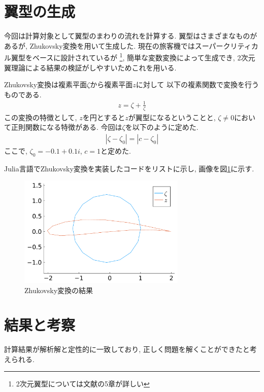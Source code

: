 \documentclass{ltjsarticle}
\begin{document}
\section{翼型の生成}
今回は計算対象として翼型のまわりの流れを計算する. 
翼型はさまざまなものがあるが, Zhukovsky変換を用いて生成した. 
現在の旅客機ではスーパークリティカル翼型をベースに設計されているが
\cite{Rinoie2011}\footnote{2次元翼型については文献\cite{Rinoie2011}の5章が詳しい},
簡単な変数変換によって生成でき, 
2次元翼理論による結果の検証がしやすいためこれを用いる.

Zhukovsky変換は複素平面$\zeta$から複素平面$z$に対して
以下の複素関数で変換を行うものである.
\begin{align}
    z = \zeta +\frac{1}{\zeta}
\end{align}
この変換の特徴として, $z$を円とすると$z$が翼型になるということと,
$\zeta\neq 0$において正則関数になる特徴がある.
今回は$\zeta$を以下のように定めた.
\begin{align}
    |\zeta- \zeta_0| = |c-\zeta_0|
\end{align}
ここで, $\zeta_0 = -0.1+0.1i$, $c=1$と定めた.

Julia言語でZhukovsky変換を実装したコードをリストに示し, 
画像を図\ref{fig:zhukovsky}に示す.
\begin{figure}[htbp]
    \centering
    \includegraphics[width=8cm]{ZhukovskyWing.pdf}
    \caption{Zhukovsky変換の結果}
    \label{fig:zhukovsky}
\end{figure}

\section{結果と考察}
計算結果が解析解と定性的に一致しており, 正しく問題を解くことができたと考えられる.

\printbibliography[title=参考文献]
\end{document}
